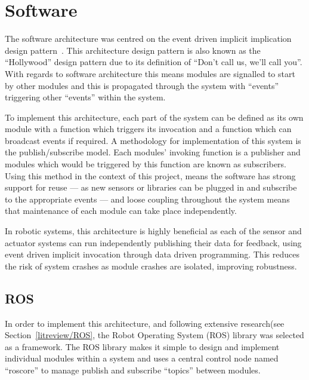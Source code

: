 
\chapter{Software}\label{software}
The software architecture was centred on the event driven implicit implication 
design pattern~\cite{garlan1993introduction}. This architecture design pattern is 
also known as the ``Hollywood'' design pattern due to its definition of ``Don't 
call us, we'll call you''. With regards to software architecture this means 
modules are signalled to start by other modules and this is propagated through 
the system with ``events'' triggering other ``events'' within the system. 

To implement this architecture, each part of the system can be defined as its own 
module with a function which triggers its invocation and a function which can 
broadcast events if required. A methodology for implementation of this system is 
the publish/subscribe model. Each modules' invoking function is a publisher and 
modules which would be triggered by this function are known as subscribers. Using 
this method in the context of this project, means the software has strong support 
for reuse --- as new sensors or libraries can be plugged in and subscribe to the 
appropriate events --- and loose coupling throughout the system means that 
maintenance of each module can take place independently. 

In robotic systems, this architecture is highly beneficial as each of the sensor 
and actuator systems can run independently publishing their data for feedback, 
using event driven implicit invocation through data driven programming. This 
reduces the risk of system crashes as module crashes are isolated, improving 
robustness.   


\section{ROS}\label{soft/ROS}
In order to implement this architecture, and following extensive research(see 
Section~\ref{litreview/ROS}, the Robot Operating System (ROS) library was 
selected as a framework. The ROS library makes it simple to design and implement 
individual modules within a system and uses a central control node named 
``roscore'' to manage publish and subscribe ``topics'' between modules. 

